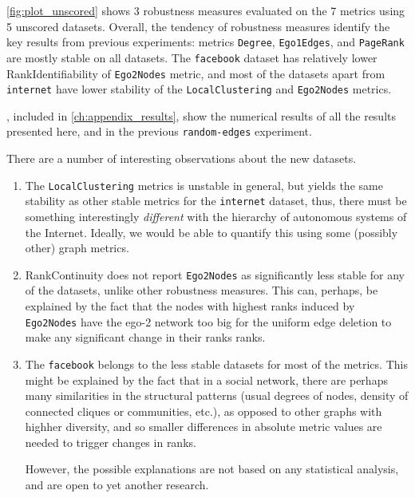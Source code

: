 

\autoref{fig:plot_unscored} shows 3 robustness measures evaluated on the 7 metrics using 5 unscored datasets.
Overall, the tendency of robustness measures identify the key results from previous experiments: metrics \texttt{Degree}, \texttt{Ego1Edges}, and \texttt{PageRank} are mostly stable on all datasets.
The \texttt{facebook} dataset has relatively lower RankIdentifiability of \texttt{Ego2Nodes} metric, and most of the datasets apart from \texttt{internet} have lower stability of the \texttt{LocalClustering} and \texttt{Ego2Nodes} metrics.

, included in \cref{ch:appendix_results}, show the numerical results of all the results presented here, and in the previous \texttt{random-edges} experiment.

There are a number of interesting observations about the new datasets.

\begin{enumerate}
    \item The \texttt{LocalClustering} metrics is unstable in general, but yields the same stability as other stable metrics for the \texttt{internet} dataset, thus, there must be something interestingly \textsl{different} with the hierarchy of autonomous systems of the Internet.
    Ideally, we would be able to quantify this using some (possibly other) graph metrics.

    \item RankContinuity does not report \texttt{Ego2Nodes} as significantly less stable for any of the datasets, unlike other robustness measures.
    This can, perhaps, be explained by the fact that the nodes with highest ranks induced by \texttt{Ego2Nodes} have the ego-2 network too big for the uniform edge deletion to make any significant change in their ranks ranks.
    \item The \texttt{facebook} belongs to the less stable datasets for most of the metrics.
    This might be explained by the fact that in a social network, there are perhaps many similarities in the structural patterns (usual degrees of nodes, density of connected cliques or communities, etc.), as opposed to other graphs with highher diversity, and so smaller differences in absolute metric values are needed to trigger changes in ranks.

    However, the possible explanations are not based on any statistical analysis, and are open to yet another research.
\end{enumerate}

